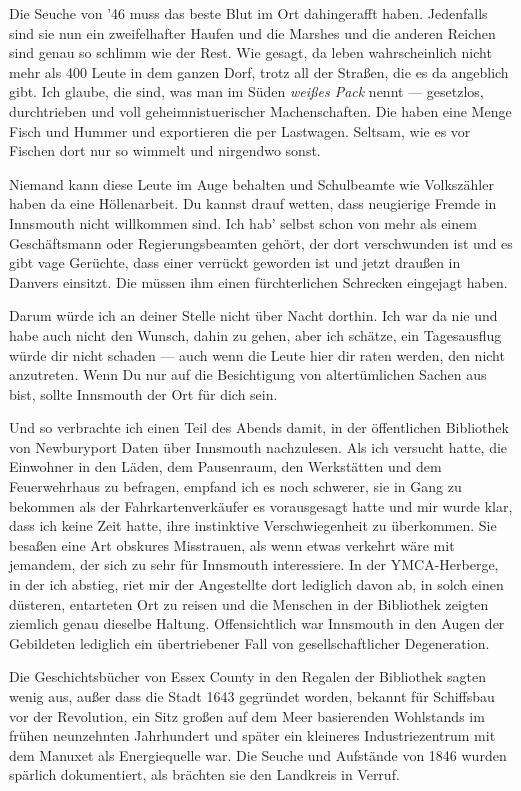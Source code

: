 Die Seuche von '46 muss das beste Blut im Ort dahingerafft haben. Jedenfalls sind sie nun ein zweifelhafter Haufen und die Marshes und die anderen Reichen sind genau so schlimm wie der Rest. Wie gesagt, da leben wahrscheinlich nicht mehr als 400 Leute in dem ganzen Dorf, trotz all der Straßen, die es da angeblich gibt. Ich glaube, die sind, was man im Süden \textit{weißes Pack} nennt --- gesetzlos, durchtrieben und voll geheimnistuerischer Machenschaften. Die haben eine Menge Fisch und Hummer und exportieren die per Lastwagen. Seltsam, wie es vor Fischen dort nur so wimmelt und nirgendwo sonst.

Niemand kann diese Leute im Auge behalten und Schulbeamte wie Volkszähler haben da eine Höllenarbeit. Du kannst drauf wetten, dass neugierige Fremde in Innsmouth nicht willkommen sind. Ich hab' selbst schon von mehr als einem Geschäftsmann oder Regierungsbeamten gehört, der dort verschwunden ist und es gibt vage Gerüchte, dass einer verrückt geworden ist und jetzt draußen in Danvers einsitzt. Die müssen ihm einen fürchterlichen Schrecken eingejagt haben.

Darum würde ich an deiner Stelle nicht über Nacht dorthin. Ich war da nie und habe auch nicht den Wunsch, dahin zu gehen, aber ich schätze, ein Tagesausflug würde dir nicht schaden --- auch wenn die Leute hier dir raten werden, den nicht anzutreten. Wenn Du nur auf die Besichtigung von altertümlichen Sachen aus bist, sollte Innsmouth der Ort für dich sein.\grqq

Und so verbrachte ich einen Teil des Abends damit, in der öffentlichen Bibliothek von Newburyport Daten über Innsmouth nachzulesen. Als ich versucht hatte, die Einwohner in den Läden, dem Pausenraum, den Werkstätten und dem Feuerwehrhaus zu befragen, empfand ich es noch schwerer, sie in Gang zu bekommen als der Fahrkartenverkäufer es vorausgesagt hatte und mir wurde klar, dass ich keine Zeit hatte, ihre instinktive Verschwiegenheit zu überkommen. Sie besaßen eine Art obskures Misstrauen, als wenn etwas verkehrt wäre mit jemandem, der sich zu sehr für Innsmouth interessiere. In der YMCA-Herberge, in der ich abstieg, riet mir der Angestellte dort lediglich davon ab, in solch einen düsteren, entarteten Ort zu reisen und die Menschen in der Bibliothek zeigten ziemlich genau dieselbe Haltung. Offensichtlich war Innsmouth in den Augen der Gebildeten lediglich ein übertriebener Fall von gesellschaftlicher Degeneration.

Die Geschichtsbücher von Essex County in den Regalen der Bibliothek sagten wenig aus, außer dass die Stadt 1643 gegründet worden, bekannt für Schiffsbau vor der Revolution, ein Sitz großen auf dem Meer basierenden Wohlstands im frühen neunzehnten Jahrhundert und später ein kleineres Industriezentrum mit dem Manuxet als Energiequelle war. Die Seuche und Aufstände von 1846 wurden spärlich dokumentiert, als brächten sie den Landkreis in Verruf.

